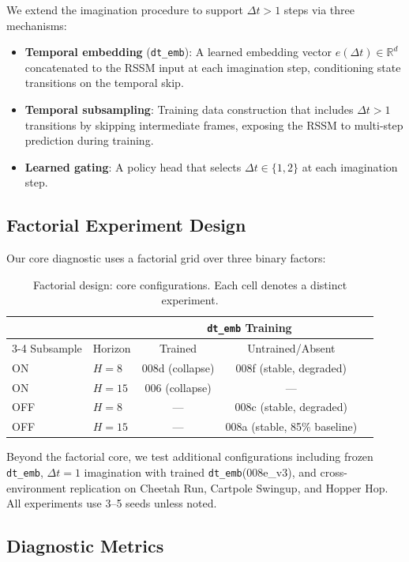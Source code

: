 \documentclass[letterpaper]{article}
\newcommand{\dtemb}{\texttt{dt\_emb}\xspace}
\begin{document}
We extend the imagination procedure to support $\Delta t>1$ steps via three mechanisms:
\begin{itemize}[nosep]
    \item \textbf{Temporal embedding} (\dtemb): A learned embedding vector $e(\Delta t) \in \mathbb{R}^d$ concatenated to the RSSM input at each imagination step, conditioning state transitions on the temporal skip.
    \item \textbf{Temporal subsampling}: Training data construction that includes $\Delta t>1$ transitions by skipping intermediate frames, exposing the RSSM to multi-step prediction during training.
    \item \textbf{Learned gating}: A policy head that selects $\Delta t \in \{1,2\}$ at each imagination step.
\end{itemize}

\subsection{Factorial Experiment Design}

Our core diagnostic uses a factorial grid over three binary factors:

\begin{table}[h]
\centering
\caption{Factorial design: core configurations. Each cell denotes a distinct experiment.}
\label{tab:factorial}
\begin{tabular}{llccc}
\toprule
 & & \multicolumn{2}{c}{\dtemb Training} \\
\cmidrule(lr){3-4}
Subsample & Horizon & Trained & Untrained/Absent \\
\midrule
ON  & $H=8$  & 008d (collapse) & 008f (stable, degraded) \\
ON  & $H=15$ & 006 (collapse) & --- \\
OFF & $H=8$  & --- & 008c (stable, degraded) \\
OFF & $H=15$ & --- & 008a (stable, 85\% baseline) \\
\bottomrule
\end{tabular}
\end{table}

Beyond the factorial core, we test additional configurations including frozen \dtemb, $\Delta t=1$ imagination with trained \dtemb (008e\_v3), and cross-environment replication on Cheetah Run, Cartpole Swingup, and Hopper Hop. All experiments use 3--5 seeds unless noted.

\subsection{Diagnostic Metrics}
\end{document}

